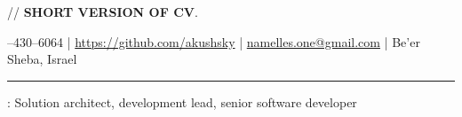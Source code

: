 \documentclass[11pt]{article}
\newif\ifdetailed
\begin{document}
%
\ifdetailed
{\small{// {\textbf{DETAILED VERSION OF CV}}. }}
\else
{\small{// {\textbf{SHORT VERSION OF CV}}. }}
\fi

\vspace{0.5em}

--430--6064    |    \url{https://github.com/akushsky}   |   \href{mailto:namelles.one@gmail.com}{namelles.one@gmail.com}  |  Be’er Sheba, Israel  \ifdetailed | Sivan 11, 5748 \fi

\vspace{0.5em}

\hrule

\vspace{1.5em}

\ifdetailed
\noindent {\textbf{CAREER OBJECTIVE}}: To gain \textbf{international experience} in IT related role (solution architect, development lead, senior software developer). Preferably working with highload systems, big data and distributed software.
\else
{}: Solution architect, development lead, senior software developer
\fi

\vspace{1em}
\end{document}
